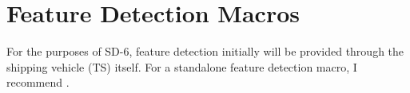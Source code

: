\section{Feature Detection Macros}\label{sec:feature-detection}

For the purposes of SD-6, feature detection initially will be provided through the shipping vehicle (TS) itself.
For a standalone feature detection macro, I recommend .

